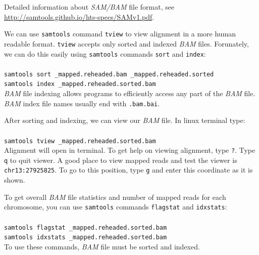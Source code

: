Detailed information about \textit{SAM/BAM} file format, see \url{http://samtools.github.io/hts-specs/SAMv1.pdf}.


We can use \texttt{samtools} command \texttt{tview} to view alignment in a
more human readable format. \texttt{tview} accepts only 
sorted and indexed \textit{BAM} files. Forunately, we can
do this easily using \texttt{samtools} commands 
\texttt{sort} and \texttt{index}:\\~\\
\texttt{samtools sort \mapReads\_mapped.reheaded.bam \mapReads\_mapped.reheaded.sorted}\\
\texttt{samtools index \mapReads\_mapped.reheaded.sorted.bam}\\

\textit{BAM} file indexing allows programs to efficiently access any part of the \textit{BAM} file.
\textit{BAM} index file names usually end with \texttt{.bam.bai}. 

After sorting and indexing, we can view our \textit{BAM} file. In linux terminal type:\\~\\
\texttt{samtools tview \mapReads\_mapped.reheaded.sorted.bam }\\

Alignment will open in terminal. To get help on viewing alignment, type \texttt{?}.
Type \texttt{q} to quit viewer. A good place to view mapped reads and
test the viewer is \texttt{chr13:27925825}. To go to this position, type \texttt{g}
and enter this coordinate as it is shown.

To get overall \textit{BAM} file statistics and number of mapped reads for each chromosome, you can use 
\texttt{samtools} commands \texttt{flagstat} and \texttt{idxstats}:\\~\\
\texttt{samtools flagstat \mapReads\_mapped.reheaded.sorted.bam}\\
\texttt{samtools idxstats \mapReads\_mapped.reheaded.sorted.bam}\\

To use these commands, \textit{BAM} file must be sorted and indexed.
